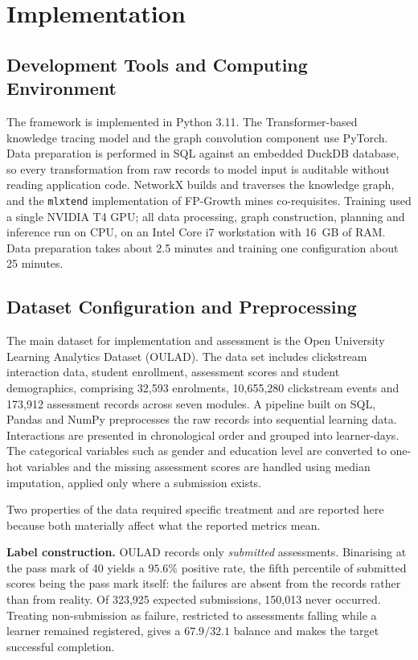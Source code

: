 \section{Implementation}
\label{sec:impl}

\subsection{Development Tools and Computing Environment}

The framework is implemented in Python 3.11. The Transformer-based knowledge tracing model
and the graph convolution component use PyTorch. Data preparation is performed in SQL
against an embedded DuckDB database, so every transformation from raw records to model
input is auditable without reading application code. NetworkX builds and traverses the
knowledge graph, and the \texttt{mlxtend} implementation of FP-Growth mines co-requisites.
Training used a single NVIDIA T4 GPU; all data processing, graph construction, planning
and inference run on CPU, on an Intel Core i7 workstation with 16~GB of RAM. Data
preparation takes about 2.5 minutes and training one configuration about 25 minutes.

\subsection{Dataset Configuration and Preprocessing}

The main dataset for implementation and assessment is the Open University Learning
Analytics Dataset (OULAD). The data set includes clickstream interaction data, student
enrollment, assessment scores and student demographics, comprising 32{,}593 enrolments,
10{,}655{,}280 clickstream events and 173{,}912 assessment records across seven modules.
A pipeline built on SQL, Pandas and NumPy preprocesses the raw records into sequential
learning data. Interactions are presented in chronological order and grouped into
learner-days. The categorical variables such as gender and education level are converted
to one-hot variables and the missing assessment scores are handled using median
imputation, applied only where a submission exists.

Two properties of the data required specific treatment and are reported here because both
materially affect what the reported metrics mean.

\textbf{Label construction.} OULAD records only \emph{submitted} assessments. Binarising
at the pass mark of 40 yields a $95.6\%$ positive rate, the fifth percentile of submitted
scores being the pass mark itself: the failures are absent from the records rather than
from reality. Of 323{,}925 expected submissions, 150{,}013 never occurred. Treating
non-submission as failure, restricted to assessments falling while a learner remained
registered, gives a $67.9/32.1$ balance and makes the target successful completion.


